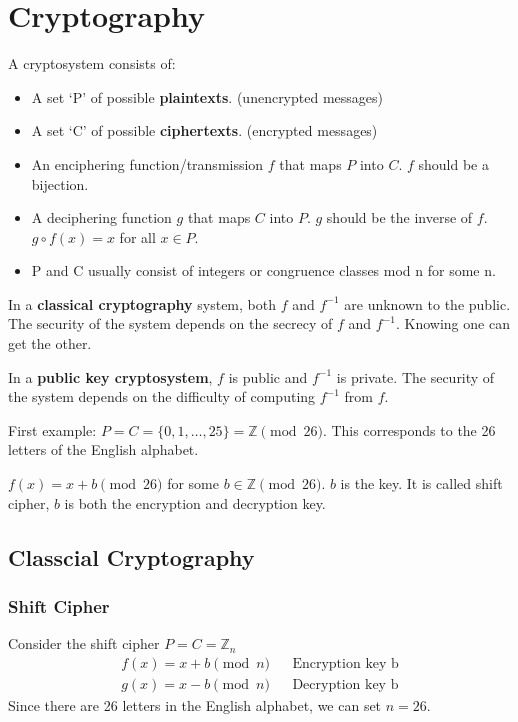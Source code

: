 \documentclass[letterpaper,12pt,oneside]{article}
\begin{document}
\section{Cryptography}
A cryptosystem consists of:\begin{itemize}
    \item A set `P' of possible \textbf{plaintexts}. (unencrypted messages)
    \item A set `C' of possible \textbf{ciphertexts}. (encrypted messages)
    \item An enciphering function/transmission $f$ that maps $P$ into $C$. $f$ should be a bijection.
    \item A deciphering function $g$ that maps $C$ into $P$. $g$ should be the inverse of $f$. $g\circ f (x)=x$ for all $x\in P$.
    \item P and C usually consist of integers or congruence classes mod n for some n.
\end{itemize}

In a \textbf{classical cryptography} system, both $f$ and $f^{-1}$ are unknown to the public. The security of the system depends on the secrecy of $f$ and $f^{-1}$. Knowing one can get the other.

In a \textbf{public key cryptosystem}, $f$ is public and $f^{-1}$ is private. The security of the system depends on the difficulty of computing $f^{-1}$ from $f$.

First example: $P=C=\{0,1,\ldots,25\}=\mathbb{Z}\pmod {26}$. This corresponds to the 26 letters of the English alphabet.

$f(x)=x+b \pmod{26}$ for some $b\in \mathbb{Z}\pmod {26}$. $b$ is the key. It is called shift cipher, $b$ is both the encryption and decryption key.

\subsection{Classcial Cryptography}
\subsubsection{Shift Cipher}
Consider the shift cipher $P=C=\mathbb{Z}_n$
\begin{align*}
    f(x)=x+b \pmod n && \text{Encryption key b} \\
    g(x)=x-b \pmod n && \text{Decryption key b}
\end{align*}
Since there are 26 letters in the English alphabet, we can set $n=26$.
\end{document}
